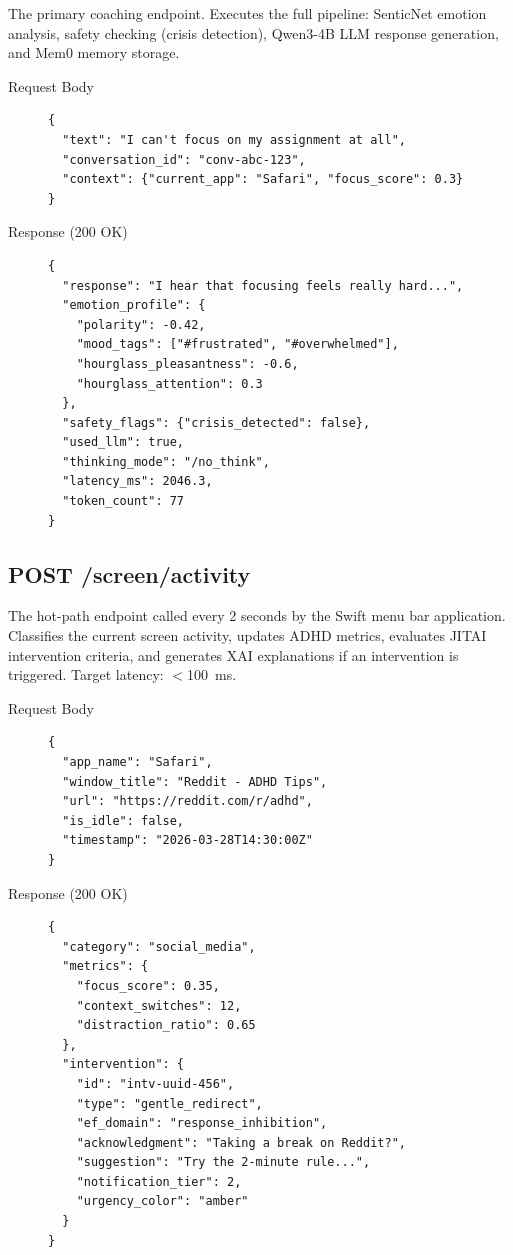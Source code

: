 The primary coaching endpoint. Executes the full pipeline: SenticNet emotion analysis, safety checking (crisis detection), Qwen3-4B LLM response generation, and Mem0 memory storage.

\begin{description}
  \item[Request Body] \hfill
\begin{lstlisting}
{
  "text": "I can't focus on my assignment at all",
  "conversation_id": "conv-abc-123",
  "context": {"current_app": "Safari", "focus_score": 0.3}
}
\end{lstlisting}

  \item[Response (200 OK)] \hfill
\begin{lstlisting}
{
  "response": "I hear that focusing feels really hard...",
  "emotion_profile": {
    "polarity": -0.42,
    "mood_tags": ["#frustrated", "#overwhelmed"],
    "hourglass_pleasantness": -0.6,
    "hourglass_attention": 0.3
  },
  "safety_flags": {"crisis_detected": false},
  "used_llm": true,
  "thinking_mode": "/no_think",
  "latency_ms": 2046.3,
  "token_count": 77
}
\end{lstlisting}
\end{description}

\subsection{POST /screen/activity}

The hot-path endpoint called every 2 seconds by the Swift menu bar application. Classifies the current screen activity, updates ADHD metrics, evaluates JITAI intervention criteria, and generates XAI explanations if an intervention is triggered. Target latency: $<$100~ms.

\begin{description}
  \item[Request Body] \hfill
\begin{lstlisting}
{
  "app_name": "Safari",
  "window_title": "Reddit - ADHD Tips",
  "url": "https://reddit.com/r/adhd",
  "is_idle": false,
  "timestamp": "2026-03-28T14:30:00Z"
}
\end{lstlisting}

  \item[Response (200 OK)] \hfill
\begin{lstlisting}
{
  "category": "social_media",
  "metrics": {
    "focus_score": 0.35,
    "context_switches": 12,
    "distraction_ratio": 0.65
  },
  "intervention": {
    "id": "intv-uuid-456",
    "type": "gentle_redirect",
    "ef_domain": "response_inhibition",
    "acknowledgment": "Taking a break on Reddit?",
    "suggestion": "Try the 2-minute rule...",
    "notification_tier": 2,
    "urgency_color": "amber"
  }
}
\end{lstlisting}
\end{description}

